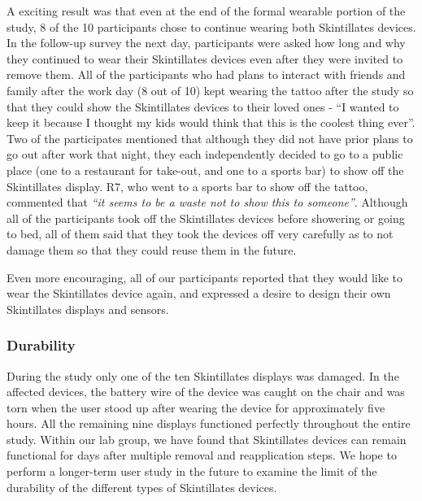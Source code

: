 \documentclass{sigchi}
\begin{document}
A exciting result was that even at the end of the formal wearable portion of the study, 8 of the 10 participants chose to continue wearing both Skintillates devices.  In the follow-up survey the next day, participants were asked how long and why they continued to wear their Skintillates devices even after they were invited to remove them. All of the participants who had plans to interact with friends and family after the work day (8 out of 10) kept wearing the tattoo after the study so that they could show the Skintillates devices to their loved ones - “I wanted to keep it because I thought my kids would think that this is the coolest thing ever”. Two of the participates mentioned that although they did not have prior plans to go out after work that night, they each independently decided to go to a public place (one to a restaurant for take-out, and one to a sports bar) to show off the Skintillates display. R7, who went to a sports bar to show off the tattoo, commented that \textit{“it seems to be a waste not to show this to someone”}. Although all of the participants took off the Skintillates devices before showering or going to bed, all of them said that they took the devices off very carefully as to not damage them so that they could reuse them in the future. 

Even more encouraging, all of our participants reported that they would like to wear the Skintillates device again, and expressed a desire to design their own Skintillates displays and sensors. 

\subsubsection{Durability}
During the study only one of the ten Skintillates displays was damaged. In the affected devices, the battery wire of the device was caught on the chair and was torn when the user stood up after wearing the device for approximately five hours. All the remaining nine displays functioned perfectly throughout the entire study. Within our lab group, we have found that Skintillates devices can remain functional for days after multiple removal and reapplication steps. We hope to perform a longer-term user study in the future to examine the limit of the durability of the different types of Skintillates devices. 
\end{document}
